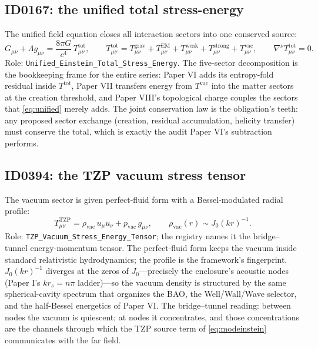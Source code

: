 \documentclass[11pt]{article}
\theoremstyle{remark}
\begin{document}
\subsection{ID0167: the unified total stress-energy}

The unified field equation closes all interaction sectors into one conserved source:
\begin{equation}
G_{\mu\nu} + \Lambda g_{\mu\nu} = \frac{8\pi G}{c^4}\, T^{\mathrm{tot}}_{\mu\nu}, \qquad
T^{\mathrm{tot}}_{\mu\nu} = T^{\mathrm{grav}}_{\mu\nu} + T^{\mathrm{EM}}_{\mu\nu} + T^{\mathrm{weak}}_{\mu\nu} + T^{\mathrm{strong}}_{\mu\nu} + T^{\mathrm{vac}}_{\mu\nu}, \qquad
\nabla^\nu T^{\mathrm{tot}}_{\mu\nu} = 0.
\label{eq:unified}
\end{equation}
Role: \texttt{Unified\_Einstein\_Total\_Stress\_Energy}. The five-sector decomposition is the bookkeeping frame for the entire series: Paper VI adds its entropy-fold residual inside $T^{\mathrm{tot}}$, Paper VII transfers energy from $T^{\mathrm{vac}}$ into the matter sectors at the creation threshold, and Paper VIII's topological charge couples the sectors that \eqref{eq:unified} merely adds. The joint conservation law is the obligation's teeth: any proposed sector exchange (creation, residual accumulation, helicity transfer) must conserve the total, which is exactly the audit Paper VI's subtraction performs.

\subsection{ID0394: the TZP vacuum stress tensor}

The vacuum sector is given perfect-fluid form with a Bessel-modulated radial profile:
\begin{equation}
T^{\mathrm{TZP}}_{\mu\nu} = \rho_{\mathrm{vac}}\, u_\mu u_\nu + p_{\mathrm{vac}}\, g_{\mu\nu}, \qquad
\rho_{\mathrm{vac}}(r) \sim J_0(kr)^{-1}.
\label{eq:vacstress}
\end{equation}
Role: \texttt{TZP\_Vacuum\_Stress\_Energy\_Tensor}; the registry names it the bridge--tunnel energy-momentum tensor. The perfect-fluid form keeps the vacuum inside standard relativistic hydrodynamics; the profile is the framework's fingerprint. $J_0(kr)^{-1}$ diverges at the zeros of $J_0$---precisely the enclosure's acoustic nodes (Paper I's $k r_s = n\pi$ ladder)---so the vacuum density is structured by the same spherical-cavity spectrum that organizes the BAO, the Well/Wall/Wave selector, and the half-Bessel energetics of Paper VI. The bridge--tunnel reading: between nodes the vacuum is quiescent; at nodes it concentrates, and those concentrations are the channels through which the TZP source term of \eqref{eq:modeinstein} communicates with the far field.
\end{document}
